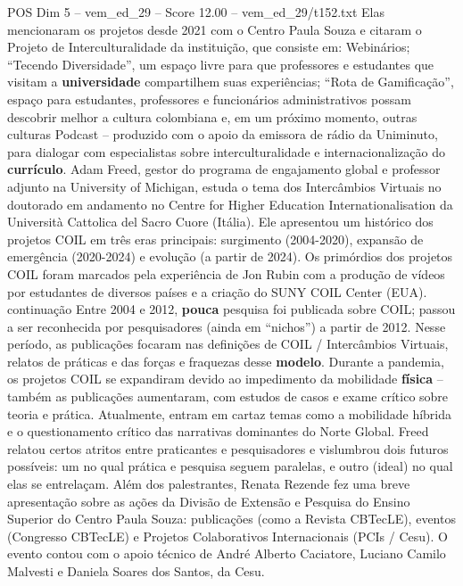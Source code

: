 \begin{textsample}{POS Dim 5 – vem\_ed\_29 – Score 12.00 – vem\_ed\_29/t152.txt}
Elas mencionaram os projetos desde 2021 com o Centro Paula Souza e citaram o Projeto de Interculturalidade da instituição, que consiste em: Webinários; “Tecendo Diversidade”, um espaço livre para que professores e estudantes que visitam a \textbf{universidade} compartilhem suas experiências; “Rota de Gamificação”, espaço para estudantes, professores e funcionários administrativos possam descobrir melhor a cultura colombiana e, em um próximo momento, outras culturas Podcast – produzido com o apoio da emissora de rádio da Uniminuto, para dialogar com especialistas sobre interculturalidade e internacionalização do \textbf{currículo}.
Adam Freed, gestor do programa de engajamento global e professor adjunto na University of Michigan, estuda o tema dos Intercâmbios Virtuais no doutorado em andamento no Centre for Higher Education Internationalisation da Università Cattolica del Sacro Cuore (Itália).
Ele apresentou um histórico dos projetos COIL em três eras principais: surgimento (2004-2020), expansão de emergência (2020-2024) e evolução (a partir de 2024).
Os primórdios dos projetos COIL foram marcados pela experiência de Jon Rubin com a produção de vídeos por estudantes de diversos países e a criação do SUNY COIL Center (EUA). continuação Entre 2004 e 2012, \textbf{pouca} pesquisa foi publicada sobre COIL; passou a ser reconhecida por pesquisadores (ainda em “nichos”) a partir de 2012.
Nesse período, as publicações focaram nas definições de COIL / Intercâmbios Virtuais, relatos de práticas e das forças e fraquezas desse \textbf{modelo}.
Durante a pandemia, os projetos COIL se expandiram devido ao impedimento da mobilidade \textbf{física} – também as publicações aumentaram, com estudos de casos e exame crítico sobre teoria e prática.
Atualmente, entram em cartaz temas como a mobilidade híbrida e o questionamento crítico das narrativas dominantes do Norte Global.
Freed relatou certos atritos entre praticantes e pesquisadores e vislumbrou dois futuros possíveis: um no qual prática e pesquisa seguem paralelas, e outro (ideal) no qual elas se entrelaçam.
Além dos palestrantes, Renata Rezende fez uma breve apresentação sobre as ações da Divisão de Extensão e Pesquisa do Ensino Superior do Centro Paula Souza: publicações (como a Revista CBTecLE), eventos (Congresso CBTecLE) e Projetos Colaborativos Internacionais (PCIs / Cesu).
O evento contou com o apoio técnico de André Alberto Caciatore, Luciano Camilo Malvesti e Daniela Soares dos Santos, da Cesu.

\end{textsample}
